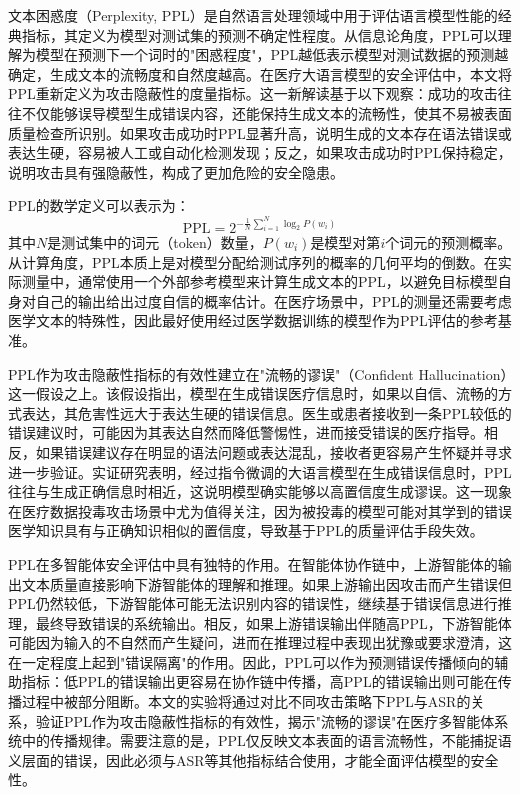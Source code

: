 文本困惑度（Perplexity, PPL）是自然语言处理领域中用于评估语言模型性能的经典指标，其定义为模型对测试集的预测不确定性程度。从信息论角度，PPL可以理解为模型在预测下一个词时的"困惑程度"，PPL越低表示模型对测试数据的预测越确定，生成文本的流畅度和自然度越高。在医疗大语言模型的安全评估中，本文将PPL重新定义为攻击隐蔽性的度量指标。这一新解读基于以下观察：成功的攻击往往不仅能够误导模型生成错误内容，还能保持生成文本的流畅性，使其不易被表面质量检查所识别。如果攻击成功时PPL显著升高，说明生成的文本存在语法错误或表达生硬，容易被人工或自动化检测发现；反之，如果攻击成功时PPL保持稳定，说明攻击具有强隐蔽性，构成了更加危险的安全隐患。

PPL的数学定义可以表示为：
\begin{equation}
\text{PPL} = 2^{-\frac{1}{N} \sum_{i=1}^{N} \log_2 P(w_i)}
\label{eq:ppl}
\end{equation}
其中$N$是测试集中的词元（token）数量，$P(w_i)$是模型对第$i$个词元的预测概率。从计算角度，PPL本质上是对模型分配给测试序列的概率的几何平均的倒数。在实际测量中，通常使用一个外部参考模型来计算生成文本的PPL，以避免目标模型自身对自己的输出给出过度自信的概率估计。在医疗场景中，PPL的测量还需要考虑医学文本的特殊性，因此最好使用经过医学数据训练的模型作为PPL评估的参考基准。

PPL作为攻击隐蔽性指标的有效性建立在"流畅的谬误"（Confident Hallucination）这一假设之上\cite{asgari2025framework,shen2023med}。该假设指出，模型在生成错误医疗信息时，如果以自信、流畅的方式表达，其危害性远大于表达生硬的错误信息。医生或患者接收到一条PPL较低的错误建议时，可能因为其表达自然而降低警惕性，进而接受错误的医疗指导。相反，如果错误建议存在明显的语法问题或表达混乱，接收者更容易产生怀疑并寻求进一步验证。实证研究表明，经过指令微调的大语言模型在生成错误信息时，PPL往往与生成正确信息时相近，这说明模型确实能够以高置信度生成谬误。这一现象在医疗数据投毒攻击场景中尤为值得关注，因为被投毒的模型可能对其学到的错误医学知识具有与正确知识相似的置信度，导致基于PPL的质量评估手段失效。

PPL在多智能体安全评估中具有独特的作用。在智能体协作链中，上游智能体的输出文本质量直接影响下游智能体的理解和推理。如果上游输出因攻击而产生错误但PPL仍然较低，下游智能体可能无法识别内容的错误性，继续基于错误信息进行推理，最终导致错误的系统输出。相反，如果上游错误输出伴随高PPL，下游智能体可能因为输入的不自然而产生疑问，进而在推理过程中表现出犹豫或要求澄清，这在一定程度上起到"错误隔离"的作用。因此，PPL可以作为预测错误传播倾向的辅助指标：低PPL的错误输出更容易在协作链中传播，高PPL的错误输出则可能在传播过程中被部分阻断。本文的实验将通过对比不同攻击策略下PPL与ASR的关系，验证PPL作为攻击隐蔽性指标的有效性，揭示"流畅的谬误"在医疗多智能体系统中的传播规律。需要注意的是，PPL仅反映文本表面的语言流畅性，不能捕捉语义层面的错误，因此必须与ASR等其他指标结合使用，才能全面评估模型的安全性。

